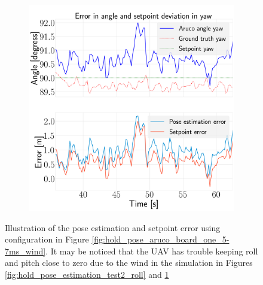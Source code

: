\documentclass[../Head/report.tex]{subfiles}
\begin{document}
\begin{figure}[H]
\begin{subfigure}[t]{.30\textwidth}
        \caption{}
        \label{fig:hold_pose_estimation_test2_pitch}
    \end{subfigure}
     \hspace{0.2em}
    \begin{subfigure}[t]{.30\textwidth}
        \centering
        \includegraphics[width=\textwidth]{../Figures/hold_pose_using_aruco_pose_estimation/test2_gps2visionBoard_1.0Wind_-1.0y/error_yaw/pose_error_yaw_test1.png}
        \caption{}
        \label{fig:hold_pose_estimation_test2_yaw}
    \end{subfigure}
    \caption{Illustration of the pose estimation and setpoint error using configuration in Figure \ref{fig:hold_pose_aruco_board_one_5-7ms_wind}. It may be noticed that the UAV has trouble keeping roll and pitch close to zero due to the wind in the simulation in Figures \ref{fig:hold_pose_estimation_test2_roll} and \ref{fig:hold_pose_estimation_test2_pitch}}
    \label{fig:hold_pose_estimation_test2_error_angle}
\end{figure}
\end{document}

